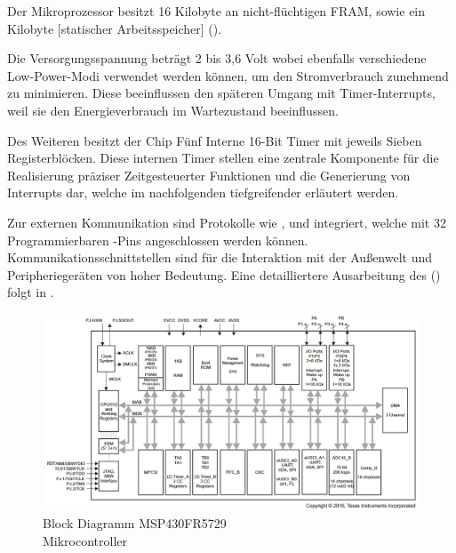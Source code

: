 \newpage
Der Mikroprozessor besitzt 16 Kilobyte an nicht-fl\"uchtigen FRAM, sowie ein Kilobyte [statischer Arbeitsspeicher] (). 

Die Versorgungsspannung betr\"agt 2 bis 3,6 Volt wobei ebenfalls verschiedene Low-Power-Modi verwendet werden k\"onnen, um den Stromverbrauch zunehmend zu minimieren. Diese beeinflussen den sp\"ateren Umgang mit Timer-Interrupts, weil sie den Energieverbrauch im Wartezustand beeinflussen. 

Des Weiteren besitzt der Chip F\"unf Interne 16-Bit Timer mit jeweils Sieben\\ Registerbl\"ocken. Diese internen Timer stellen eine zentrale Komponente f\"ur die Realisierung pr\"aziser Zeitgesteuerter Funktionen und die Generierung von Interrupts dar, welche im nachfolgenden  tiefgreifender erl\"autert werden.

Zur externen Kommunikation sind Protokolle wie ,  und  integriert, welche mit 32 Programmierbaren -Pins angeschlossen werden k\"onnen. Kommunikationsschnittstellen sind f\"ur die Interaktion mit der Au{\ss}enwelt und Peripherieger\"aten von hoher Bedeutung. Eine detailliertere Ausarbeitung des  () folgt in . 	

\begin{figure}[h!]
	\centering
	\includegraphics[width=1.0\textwidth]{../Bilder/FunctionalBlockDiagram_MSP430FR5729.png}
	\caption{Block Diagramm MSP430FR5729\\Mikrocontroller {}}
	\label{fig:BlockDiagramm_msp430}
\end{figure}

